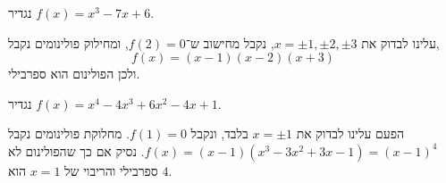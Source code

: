 \subquestion{}
נגדיר $f(x) = x^3 - 7x + 6$.
\begin{solution}
	עלינו לבדוק את $x = \pm 1, \pm 2, \pm 3$,
	נקבל מחישוב ש־$f(2) = 0$, ומחילוק פולינומים נקבל,
	\[
		f(x)
		= (x - 1) (x - 2) (x + 3)
	\]
	ולכן הפולינום הוא ספרבילי.
\end{solution}

\subquestion{}
נגדיר $f(x) = x^4 - 4x^3 + 6x^2 - 4x + 1$.
\begin{solution}
	הפעם עלינו לבדוק את $x = \pm 1$ בלבד, ונקבל $f(1) = 0$.
	מחלוקת פולינומים נקבל $f(x) = (x - 1)(x^3 - 3x^2 + 3x - 1) = {(x - 1)}^4$.
	נסיק אם כך שהפולינום לא ספרבילי והריבוי של $x = 1$ הוא $4$.
\end{solution}

\question{}



